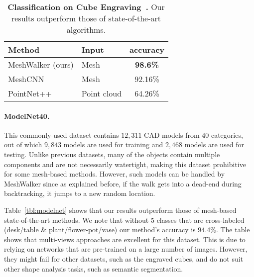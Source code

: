 \documentclass[acmtog]{acmart}
\begin{document}
\begin{table}[htb]\caption{{\bf Classification on Cube Engraving~\cite{hanocka2019meshcnn}.} 
Our results outperform those of state-of-the-art algorithms.}
\begin{center}
\begin{tabular}{||l l c||} 
\hline
 Method & Input & accuracy\\ [0.5ex] 
 \hline\hline\hline
 MeshWalker (ours) & Mesh & \textbf{98.6\%} \\ 
 \hline
 MeshCNN~\cite{hanocka2019meshcnn} & Mesh & 92.16\% \\
 \hline\hline
 PointNet++~\cite{qi2017pointnet++} & Point cloud & 64.26\% \\
 \hline
\end{tabular}
\label{tbl:cubes}
\end{center}
\end{table}


\paragraph{ModelNet40.}
This commonly-used dataset contains $12,311$ CAD models from $40$ categories, out of which $9,843$ models are used for training and $2,468$ models are used for testing.
Unlike previous datasets, many of the objects contain multiple components and are not necessarily watertight, making this dataset prohibitive for some mesh-based methods.
However, such models can be handled by MeshWalker since as explained before, if the walk gets into a dead-end during backtracking, it jumps to a new random location.

Table~\ref{tbl:modelnet} shows that our results  outperform those of mesh-based state-of-the-art methods.
We note that without $5$ classes that are cross-labeled (desk/table \& plant/flower-pot/vase) our method's accuracy is $94.4\%$.
The table shows that multi-views approaches are excellent for this dataset. 
This is due to relying on networks that are pre-trained on a large number of images.
However, they might fail for other datasets, such as the engraved cubes, and do not suit other shape analysis tasks, such as semantic segmentation.
\end{document}
